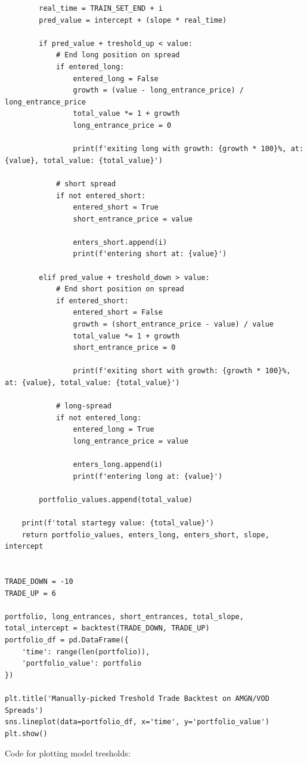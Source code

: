 \documentclass{article}
\begin{document}
\begin{spacing}{2.0}
\begin{lstlisting}
        real_time = TRAIN_SET_END + i
        pred_value = intercept + (slope * real_time)

        if pred_value + treshold_up < value:
            # End long position on spread
            if entered_long:
                entered_long = False
                growth = (value - long_entrance_price) / long_entrance_price
                total_value *= 1 + growth
                long_entrance_price = 0

                print(f'exiting long with growth: {growth * 100}%, at: {value}, total_value: {total_value}')

            # short spread
            if not entered_short:
                entered_short = True
                short_entrance_price = value

                enters_short.append(i)
                print(f'entering short at: {value}')

        elif pred_value + treshold_down > value:
            # End short position on spread
            if entered_short:
                entered_short = False
                growth = (short_entrance_price - value) / value
                total_value *= 1 + growth
                short_entrance_price = 0

                print(f'exiting short with growth: {growth * 100}%, at: {value}, total_value: {total_value}')

            # long-spread
            if not entered_long:
                entered_long = True
                long_entrance_price = value

                enters_long.append(i)
                print(f'entering long at: {value}')

        portfolio_values.append(total_value)

    print(f'total startegy value: {total_value}')
    return portfolio_values, enters_long, enters_short, slope, intercept


TRADE_DOWN = -10
TRADE_UP = 6

portfolio, long_entrances, short_entrances, total_slope, total_intercept = backtest(TRADE_DOWN, TRADE_UP)
portfolio_df = pd.DataFrame({
    'time': range(len(portfolio)),
    'portfolio_value': portfolio
})

plt.title('Manually-picked Treshold Trade Backtest on AMGN/VOD Spreads')
sns.lineplot(data=portfolio_df, x='time', y='portfolio_value')
plt.show()
\end{lstlisting}

Code for plotting model tresholds:


\end{spacing}
\end{document}
